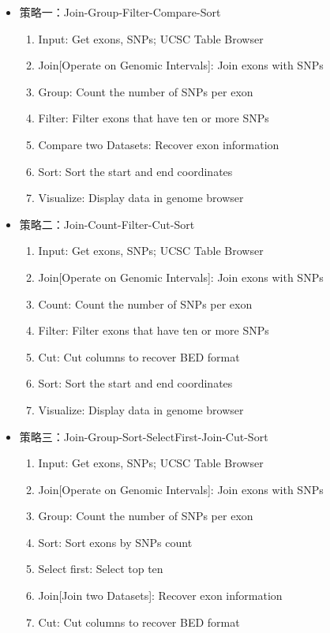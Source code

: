 \documentclass[11pt,a4paper,twoside]{book}
\begin{document}
\begin{itemize}
  \item 策略一：Join-Group-Filter-Compare-Sort
    \begin{enumerate}
      \item Input: Get exons, SNPs; UCSC Table Browser
      \item Join[Operate on Genomic Intervals]: Join exons with SNPs
      \item Group: Count the number of SNPs per exon 
      \item Filter: Filter exons that have ten or more SNPs
      \item Compare two Datasets: Recover exon information
      \item Sort: Sort the start and end coordinates
      \item Visualize: Display data in genome browser
    \end{enumerate}
  \item 策略二：Join-Count-Filter-Cut-Sort
    \begin{enumerate}
      \item Input: Get exons, SNPs; UCSC Table Browser
      \item Join[Operate on Genomic Intervals]: Join exons with SNPs
      \item Count: Count the number of SNPs per exon 
      \item Filter: Filter exons that have ten or more SNPs
      \item Cut: Cut columns to recover BED format
      \item Sort: Sort the start and end coordinates
      \item Visualize: Display data in genome browser
    \end{enumerate}
  \item 策略三：Join-Group-Sort-SelectFirst-Join-Cut-Sort
    \begin{enumerate}
      \item Input: Get exons, SNPs; UCSC Table Browser
      \item Join[Operate on Genomic Intervals]: Join exons with SNPs
      \item Group: Count the number of SNPs per exon 
      \item Sort: Sort exons by SNPs count
      \item Select first: Select top ten
      \item Join[Join two Datasets]: Recover exon information
      \item Cut: Cut columns to recover BED format

\end{enumerate}
\end{itemize}
\end{document}
